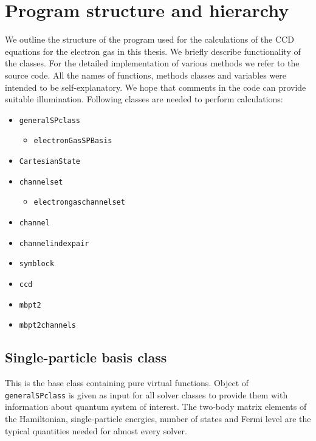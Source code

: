 \documentclass[twoside,english]{uiofysmaster}
\newcommand{\classname}[1]{\texttt{#1}}
\begin{document}
\section{Program structure and hierarchy}

We outline the structure of the program used for the calculations of the CCD equations for the electron gas in this thesis. We briefly describe functionality of the classes. For the detailed implementation of various methods we refer to the source code. All the names of functions, methods classes and variables were intended  to be self-explanatory. We hope that comments in the code can provide suitable illumination. Following classes are needed to perform calculations:

\begin{itemize}
	\item \classname{generalSPclass}

	\begin{itemize}
	\item \classname{electronGasSPBasis}

	
	\end{itemize}
	\item \classname{CartesianState}	
	\item \classname{channelset}
	\begin{itemize}
	\item \classname{electrongaschannelset}
	\end{itemize}
	\item \classname{channel}
	\item \classname{channelindexpair}
	\item \classname{symblock}
	\item \classname{ccd}
	\item \classname{mbpt2}
	\item \classname{mbpt2channels}
	
\end{itemize}
	
	
\subsection{Single-particle basis class}
	This is the base class containing pure virtual functions. Object of \classname{generalSPclass} is given as input for all solver classes to provide them with information about quantum system of interest. The two-body matrix elements of the Hamiltonian, single-particle energies, number of states and Fermi level are the typical quantities needed for almost every solver. %
\end{document}
